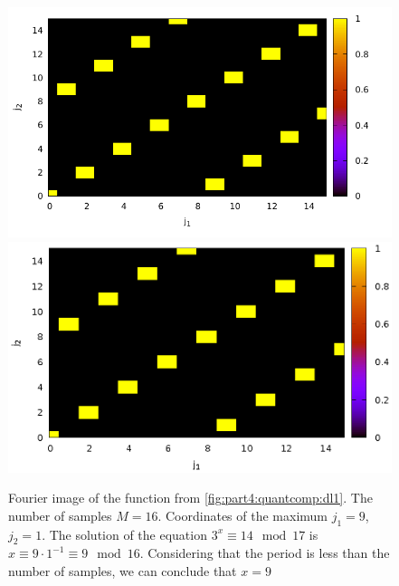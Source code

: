 \begin{figure}
\centering

\ifpdf
\includegraphics[angle=0]
{./part4/quantcomp/picdiscretlog2.pdf}
\else
\includegraphics[angle=0]
{./part4/quantcomp/picdiscretlog2.eps}
\fi

%

\caption{Fourier image of the function from \autoref{fig:part4:quantcomp:dl1}.
  The number of samples $M=16$. Coordinates of the maximum $j_1 = 9$, $j_2 = 1$.
The solution of the equation $3^x \equiv 14 \mod 17$
is $x \equiv 9 \cdot 1^{-1} \equiv 9 \mod 16$. Considering that
the period is less than the number of samples, we can conclude that $x = 9$} 
\label{fig:part4:quantcomp:dl2}
\end{figure}